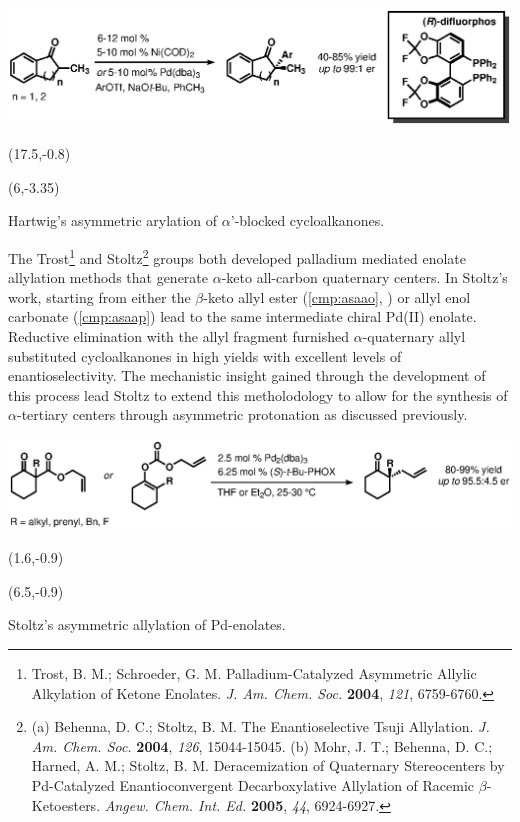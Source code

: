    \begin{Scheme}[h]
  \centering
  \includegraphics[scale=0.8]{chp_asymmetric/images/hartwigarylation}
  \begin{textblock}{1}(17.5,-0.8)  \end{textblock}
  \begin{textblock}{1}(6,-3.35)  \end{textblock}
  \caption{Hartwig's asymmetric arylation of $\alpha$'-blocked cycloalkanones.}
  \label{sch:ashartwigarylation}
\end{Scheme}   
 
 
 The Trost\footnote{{\frenchspacing Trost, B. M.; Schroeder, G. M.
 Palladium-Catalyzed Asymmetric Allylic Alkylation of Ketone Enolates. \textit{J. Am. Chem. Soc.}
 \textbf{2004}, \textit{121}, 6759-6760.}} and Stoltz\footnote{(a) {\frenchspacing Behenna, D.
 C.; Stoltz, B.
 M.
 The Enantioselective Tsuji Allylation. \textit{J. Am. Chem. Soc.} \textbf{2004}, \textit{126}, 15044-15045.} (b)
 {\frenchspacing Mohr, J. T.; Behenna, D. C.; Harned, A. M.; Stoltz, B. M. Deracemization of
 Quaternary Stereocenters by Pd-Catalyzed Enantioconvergent Decarboxylative Allylation of Racemic
 $\beta$-Ketoesters. \textit{Angew. Chem. Int. Ed.} \textbf{2005}, \textit{44}, 6924-6927.}} groups both developed palladium mediated enolate allylation methods that
 generate $\alpha$-keto all-carbon quaternary centers. In Stoltz's work, starting from either the
 $\beta$-keto allyl ester (\ref{cmp:asaao}, ) or allyl enol carbonate
 (\ref{cmp:asaap}) lead to the same intermediate chiral Pd(II) enolate. Reductive elimination with
 the allyl fragment furnished $\alpha$-quaternary allyl substituted cycloalkanones in high yields
 with excellent levels of enantioselectivity. The mechanistic insight gained through the development of
 this process lead Stoltz to extend this metholodology to allow for the synthesis of
 $\alpha$-tertiary centers through asymmetric protonation as discussed
 previously.
  \begin{Scheme}[h]
  \centering
  \includegraphics[scale=0.8]{chp_asymmetric/images/stoltzallylation}
  \begin{textblock}{1}(1.6,-0.9)  \end{textblock}
  \begin{textblock}{1}(6.5,-0.9)  \end{textblock}
  \caption{Stoltz's asymmetric allylation of Pd-enolates.}
  \label{sch:stoltzallylation}
\end{Scheme}   
 
